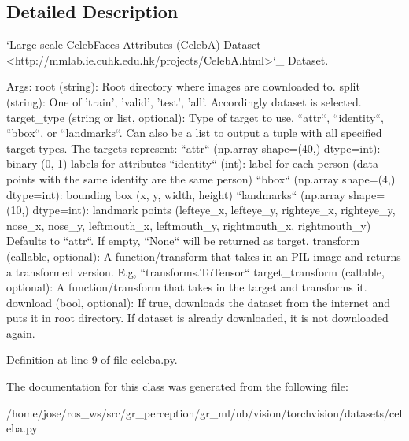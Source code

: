 \subsection{Detailed Description}
\begin{DoxyVerb}`Large-scale CelebFaces Attributes (CelebA) Dataset <http://mmlab.ie.cuhk.edu.hk/projects/CelebA.html>`_ Dataset.

Args:
    root (string): Root directory where images are downloaded to.
    split (string): One of {'train', 'valid', 'test', 'all'}.
        Accordingly dataset is selected.
    target_type (string or list, optional): Type of target to use, ``attr``, ``identity``, ``bbox``,
        or ``landmarks``. Can also be a list to output a tuple with all specified target types.
        The targets represent:
            ``attr`` (np.array shape=(40,) dtype=int): binary (0, 1) labels for attributes
            ``identity`` (int): label for each person (data points with the same identity are the same person)
            ``bbox`` (np.array shape=(4,) dtype=int): bounding box (x, y, width, height)
            ``landmarks`` (np.array shape=(10,) dtype=int): landmark points (lefteye_x, lefteye_y, righteye_x,
                righteye_y, nose_x, nose_y, leftmouth_x, leftmouth_y, rightmouth_x, rightmouth_y)
        Defaults to ``attr``. If empty, ``None`` will be returned as target.
    transform (callable, optional): A function/transform that  takes in an PIL image
        and returns a transformed version. E.g, ``transforms.ToTensor``
    target_transform (callable, optional): A function/transform that takes in the
        target and transforms it.
    download (bool, optional): If true, downloads the dataset from the internet and
        puts it in root directory. If dataset is already downloaded, it is not
        downloaded again.
\end{DoxyVerb}
 

Definition at line 9 of file celeba.\+py.



The documentation for this class was generated from the following file\+:\begin{DoxyCompactItemize}
\item 
/home/jose/ros\+\_\+ws/src/gr\+\_\+perception/gr\+\_\+ml/nb/vision/torchvision/datasets/celeba.\+py\end{DoxyCompactItemize}

